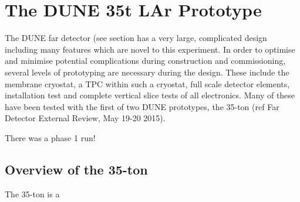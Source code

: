 \section{The DUNE 35t LAr Prototype}

The DUNE far detector (see section
has a very large, complicated design including many features which are novel to this experiment. In order to optimise and minimise potential complications during construction and commissioning, several levels of prototyping are necessary during the design. These include the membrane cryostat, a TPC within such a cryostat, full scale detector elements, installation test and complete vertical slice tests of all electronics. Many of these have been tested with the first of two DUNE prototypes, the 35-ton (ref Far Detector External Review, May 19-20 2015).

There was a phase 1 run! \cite{LBNE35tPhase1}

\subsection{Overview of the 35-ton}

The 35-ton is a 
